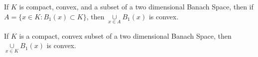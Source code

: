 \documentclass[crop=false,class=article,oneside]{standalone}
\begin{document}
        \begin{theorem}
        If $K$ is compact, convex, and a subset of a two dimensional Banach Space, then if $A = \{x\in K:B_{1}(x)\subset K\}$, then $\underset{x\in A}\cup B_{1}(x)$ is convex.
        \end{theorem}
        \begin{theorem}
        If $K$ is a compact, convex subset of a two dimensional Banach Space, then $\underset{x\in K}\cup B_{1}(x)$ is convex.
        \end{theorem}
\end{document}
